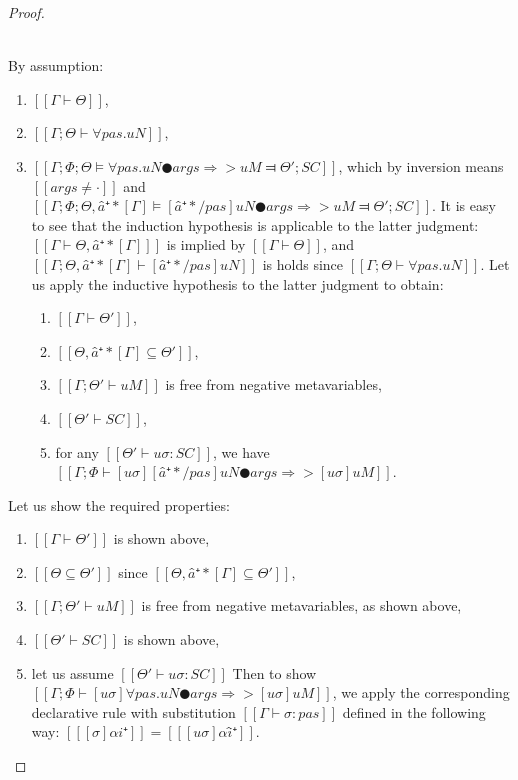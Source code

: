 \begin{proof}
\begin{caseof}
        \item {}\\
        By assumption:
        \begin{enumerate}
            \item $[[Γ ⊢ Θ]]$,
            \item $[[Γ; Θ ⊢ ∀pas.uN]]$,
            \item $[[Γ; Φ; Θ ⊨ ∀pas.uN ● args ⇒> uM ⫤ Θ'; SC]]$, which by inversion means
                $[[args ≠ ·]]$ and $[[Γ; Φ; Θ, â⁺*[Γ] ⊨ [â⁺*/pas]uN ● args ⇒> uM ⫤ Θ'; SC]]$.
                It is easy to see that the induction hypothesis is applicable to the latter judgment:
                $[[Γ ⊢ Θ, â⁺*[Γ] ]]$ is implied by $[[Γ ⊢ Θ]]$, and $[[Γ; Θ, â⁺*[Γ] ⊢ [â⁺*/pas]uN]]$
                is holds since $[[Γ; Θ ⊢ ∀pas.uN]]$.
                Let us apply the inductive hypothesis to the latter judgment to obtain:
                \begin{enumerate}
                    \item $[[Γ ⊢ Θ']]$,
                    \item $[[Θ, â⁺*[Γ] ⊆ Θ']]$,
                    \item $[[Γ; Θ' ⊢ uM]]$ is free from negative metavariables,
                    \item $[[Θ' ⊢ SC]]$,
                    \item for any $[[Θ' ⊢ uσ : SC]]$, we have $[[ Γ ; Φ ⊢ [uσ][â⁺*/pas]uN ● args ⇒> [uσ]uM ]]$.
                \end{enumerate}
        \end{enumerate}

        Let us show the required properties:
        \begin{enumerate}
            \item $[[Γ ⊢ Θ']]$ is shown above,
            \item $[[Θ ⊆ Θ']]$ since $[[Θ, â⁺*[Γ] ⊆ Θ']]$,
            \item $[[Γ; Θ' ⊢ uM]]$ is free from negative metavariables, as shown above,
            \item $[[Θ' ⊢ SC]]$ is shown above,
            \item let us assume $[[Θ' ⊢ uσ : SC]]$
            Then to show $[[ Γ ; Φ ⊢ [uσ]∀pas.uN ● args ⇒> [uσ]uM ]]$,
            we apply the corresponding declarative rule 
            with substitution $[[ Γ ⊢ σ : pas ]]$  defined in the following way:
            $[[ [σ]αi⁺ ]] = [[ [uσ]αî⁺ ]]$.


\end{enumerate}
\end{caseof}
\end{proof}
